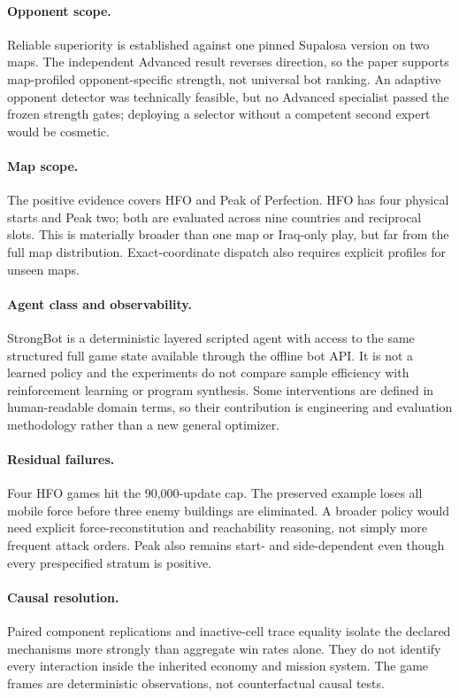 \paragraph{Opponent scope.}
Reliable superiority is established against one pinned Supalosa version on two
maps. The independent Advanced result reverses direction, so the paper supports
map-profiled opponent-specific strength, not universal bot ranking. An adaptive
opponent detector was technically feasible, but no Advanced specialist passed
the frozen strength gates; deploying a selector without a competent second
expert would be cosmetic.

\paragraph{Map scope.}
The positive evidence covers HFO and Peak of Perfection. HFO has four physical
starts and Peak two; both are evaluated across nine countries and reciprocal
slots. This is materially broader than one map or Iraq-only play, but far from
the full map distribution. Exact-coordinate dispatch also requires explicit
profiles for unseen maps.

\paragraph{Agent class and observability.}
StrongBot is a deterministic layered scripted agent with access to the same
structured full game state available through the offline bot API\@. It is not a
learned policy and the experiments do not compare sample efficiency with
reinforcement learning or program synthesis. Some interventions are defined in
human-readable domain terms, so their contribution is engineering and
evaluation methodology rather than a new general optimizer.

\paragraph{Residual failures.}
Four HFO games hit the 90,000-update cap. The preserved example loses all
mobile force before three enemy buildings are eliminated. A broader policy
would need explicit force-reconstitution and reachability reasoning, not simply
more frequent attack orders. Peak also remains start- and side-dependent even
though every prespecified stratum is positive.

\paragraph{Causal resolution.}
Paired component replications and inactive-cell trace equality isolate the
declared mechanisms more strongly than aggregate win rates alone. They do not
identify every interaction inside the inherited economy and mission system.
The game frames are deterministic observations, not counterfactual causal
tests.

